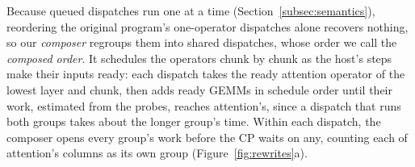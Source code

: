 Because queued dispatches run one at a time (Section~\ref{subsec:semantics}), reordering the original program's one-operator dispatches alone recovers nothing, so our \emph{composer} regroups them into shared dispatches, whose order we call the \emph{composed order}.
It schedules the operators chunk by chunk as the host's steps make their inputs ready: each dispatch takes the ready attention operator of the lowest layer and chunk, then adds ready GEMMs in schedule order until their work, estimated from the probes, reaches attention's, since a dispatch that runs both groups takes about the longer group's time.
Within each dispatch, the composer opens every group's work before the CP waits on any, counting each of attention's columns as its own group (Figure~\ref{fig:rewrites}a).

